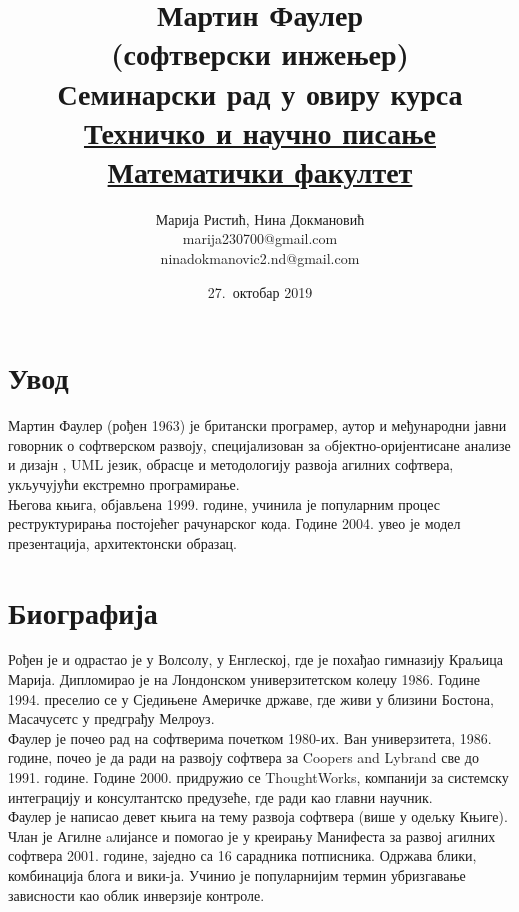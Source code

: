 \documentclass[12pt,a4paper]{article}
\begin{document}
\title{\textbf{Мартин Фаулер \\(софтверски инжењер)}\\ \small{Семинарски рад у овиру курса\\ \href{http://www.itkomunikacija.matf.bg.ac.rs/TehnickoINaucnoPisanje.html}{Техничко и научно писање}\\\href{http://www.matf.bg.ac.rs/}{Математички факултет}}}
\author{Марија Ристић, Нина Докмановић\\marija230700@gmail.com\\ninadokmanovic2.nd@gmail.com}
\date{27.~октобар 2019}

\maketitle
\tableofcontents
\newpage

\section{{Увод}}
\label{sec:uvod}
Мартин Фаулер (рођен 1963) је британски програмер, аутор и међународни јавни говорник о софтверском развоју, специјализован за oбјектно-оријентисане анализе и дизајн , UML језик, обрасце и методологију развоја агилних софтвера, укључујући екстремно програмирање. \\Његова књига, објављена 1999. године, учинила је популарним процес реструктурирања постојећег рачунарског кода\cite{k_1}. Године 2004. увео је модел презентација, архитектонски образац.\cite{k_2}
\section{{Биографија}}
\label{sec:biografija}
Рођен је и одрастао је у Волсолу, у Енглеској, где је похађао гимназију Краљица Марија. Дипломирао је на Лондонском универзитетском колеџу 1986. Године 1994. преселио се у Сједињене Америчке државе, где живи у близини Бостона, Масачусетс у предграђу Мелроуз\cite{sajt}.\\
Фаулер је почео рад на софтверима почетком 1980-их. Ван универзитета, 1986. године, почео је да ради на развоју софтвера за Coopers and Lybrand све до 1991.\cite{k_3} године. Године 2000. придружио се ThoughtWorks, компанији за системску интеграцију и консултантско предузеће\cite{sajt}, где ради као главни научник.\cite{sajt_2}\\
Фаулер је написао девет књига на тему развоја софтвера (више у одељку Књиге). Члан је Агилне aлијансе и помогао је у креирању Манифеста за развој агилних софтвера 2001. године, заједно са 16 сарадника потписника.\cite{sajt_3} Одржава блики, комбинација блога и вики-ја. Учинио је популарнијим термин убризгавање зависности као облик инверзије контроле. \cite{sajt_4, knjiga}
\end{document}
